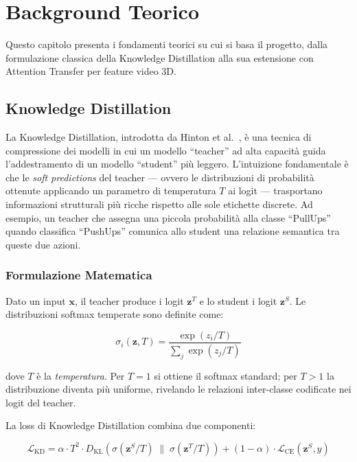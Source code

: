 \chapter{Background Teorico}
\label{chap:background}

Questo capitolo presenta i fondamenti teorici su cui si basa il progetto, dalla formulazione classica della Knowledge Distillation alla sua estensione con Attention Transfer per feature video 3D.

\section{Knowledge Distillation}

La Knowledge Distillation, introdotta da Hinton et al.~\cite{hinton2015distilling}, è una tecnica di compressione dei modelli in cui un modello ``teacher'' ad alta capacità guida l'addestramento di un modello ``student'' più leggero. L'intuizione fondamentale è che le \textit{soft predictions} del teacher --- ovvero le distribuzioni di probabilità ottenute applicando un parametro di temperatura $T$ ai logit --- trasportano informazioni strutturali più ricche rispetto alle sole etichette discrete. Ad esempio, un teacher che assegna una piccola probabilità alla classe ``PullUps'' quando classifica ``PushUps'' comunica allo student una relazione semantica tra queste due azioni.

\subsection{Formulazione Matematica}

Dato un input $\mathbf{x}$, il teacher produce i logit $\mathbf{z}^T$ e lo student i logit $\mathbf{z}^S$. Le distribuzioni softmax temperate sono definite come:

\begin{equation}
    \sigma_i(\mathbf{z}, T) = \frac{\exp(z_i / T)}{\sum_j \exp(z_j / T)}
\end{equation}

dove $T$ è la \textit{temperatura}. Per $T = 1$ si ottiene il softmax standard; per $T > 1$ la distribuzione diventa più uniforme, rivelando le relazioni inter-classe codificate nei logit del teacher.

La loss di Knowledge Distillation combina due componenti:

\begin{equation}
    \mathcal{L}_{\text{KD}} = \alpha \cdot T^2 \cdot D_{\text{KL}}\!\left(\sigma(\mathbf{z}^S/T) \;\|\; \sigma(\mathbf{z}^T/T)\right) + (1 - \alpha) \cdot \mathcal{L}_{\text{CE}}(\mathbf{z}^S, y)
    \label{eq:kd_loss}
\end{equation}

